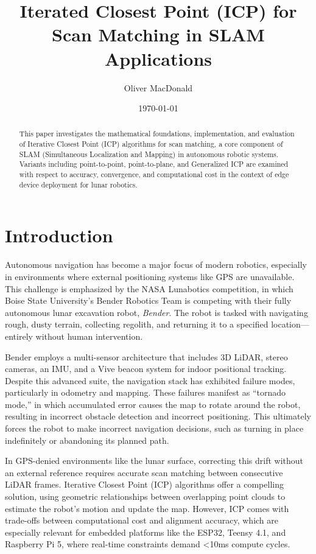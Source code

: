 \documentclass[11pt]{article}
\title{Iterated Closest Point (ICP) for Scan Matching in SLAM Applications}
\author{Oliver MacDonald}
\date{\today}
\begin{document}
\maketitle

\begin{abstract}
This paper investigates the mathematical foundations, implementation, and evaluation of Iterative Closest Point (ICP) algorithms for scan matching, a core component of SLAM (Simultaneous Localization and Mapping) in autonomous robotic systems. Variants including point-to-point, point-to-plane, and Generalized ICP are examined with respect to accuracy, convergence, and computational cost in the context of edge device deployment for lunar robotics.
\end{abstract}

\section{Introduction}

Autonomous navigation has become a major focus of modern robotics, especially in environments where external positioning systems like GPS are unavailable. This challenge is emphasized by the NASA Lunabotics competition, in which Boise State University's Bender Robotics Team is competing with their fully autonomous lunar excavation robot, \textit{Bender}. The robot is tasked with navigating rough, dusty terrain, collecting regolith, and returning it to a specified location—entirely without human intervention.


Bender employs a multi-sensor architecture that includes 3D LiDAR, stereo cameras, an IMU, and a Vive beacon system for indoor positional tracking. Despite this advanced suite, the navigation stack has exhibited failure modes, particularly in odometry and mapping. These failures manifest as “tornado mode,” in which accumulated error causes the map to rotate around the robot, resulting in incorrect obstacle detection and incorrect positioning. This ultimately forces the robot to make incorrect navigation decisions, such as turning in place indefinitely or abandoning its planned path.


In GPS-denied environments like the lunar surface, correcting this drift without an external reference requires accurate scan matching between consecutive LiDAR frames. Iterative Closest Point (ICP) algorithms offer a compelling solution, using geometric relationships between overlapping point clouds to estimate the robot's motion and update the map. However, ICP comes with trade-offs between computational cost and alignment accuracy, which are especially relevant for embedded platforms like the ESP32, Teensy 4.1, and Raspberry Pi 5, where real-time constraints demand <10ms compute cycles.
\end{document}
